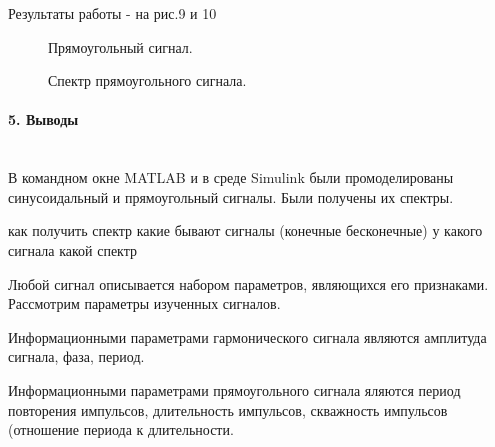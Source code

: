 \documentclass[12pt,a4paper]{report}
\begin{document}
Результаты работы - на рис.9 и 10
\begin{figure}[h!]
\caption{Прямоугольный сигнал.}
\end{figure}
\begin{figure}[h!]
\caption{Спектр прямоугольного сигнала.}
\end{figure}
\newpage
\paragraph{5. Выводы\\\\}
В командном окне MATLAB и в среде Simulink
были промоделированы синусоидальный и прямоугольный сигналы. Были получены их спектры.

как получить спектр какие бывают сигналы (конечные бесконечные) у какого сигнала какой спектр

Любой сигнал описывается набором параметров, являющихся его признаками. Рассмотрим параметры изученных сигналов.

Информационными параметрами гармонического сигнала являются амплитуда сигнала, фаза, период.

Информационными параметрами прямоугольного сигнала яляются период повторения импульсов, длительность импульсов, скважность импульсов (отношение периода к длительности.
\end{document}

